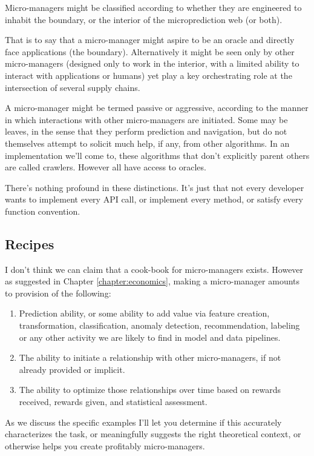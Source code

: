 Micro-managers might be classified according to whether they are engineered to inhabit the boundary, or the interior of the microprediction web (or both). 

That is to say that a micro-manager might aspire to be an oracle and directly face applications (the boundary). Alternatively it might be seen only by other micro-managers (designed only to work in the interior, with a limited ability to interact with applications or humans) yet play a key orchestrating role at the intersection of several supply chains. 

A micro-manager might be termed passive or aggressive, according to the manner in which interactions with other micro-managers are initiated. Some may be leaves, in the sense that they perform prediction and navigation, but do not themselves attempt to solicit much help, if any, from other algorithms. In an implementation we'll come to, these algorithms that don't explicitly parent others are called crawlers. However all have access to oracles. 


There's nothing profound in these distinctions. It's just that not every developer wants to implement every API call, or implement every method, or satisfy every function convention.    

\subsection{Recipes}

I don't think we can claim that a cook-book for micro-managers exists. However as suggested in Chapter \ref{chapter:economics}, making a micro-manager amounts to provision of the following:

\begin{enumerate}
    \item Prediction ability, or some ability to add value via feature creation, transformation, classification, anomaly detection, recommendation, labeling or any other activity we are likely to find in model and data pipelines.  
    \item The ability to initiate a relationship with other micro-managers, if not already provided or implicit.  
    \item The ability to optimize those relationships over time based on rewards received, rewards given, and statistical assessment. 
\end{enumerate}

As we discuss the specific examples I'll let you determine if this accurately characterizes the task, or meaningfully suggests the right theoretical context, or otherwise helps you create profitably micro-managers. 

